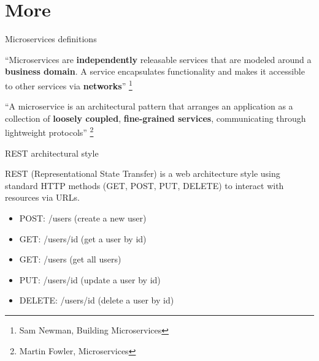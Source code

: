 \documentclass{beamer}
\begin{document}
\section{More}
\begin{frame}{Microservices definitions}
	\label{microservices_definitions}
	\begin{block}{}
		“Microservices are \textbf{independently} releasable services that are modeled around a \textbf{business domain}. A service encapsulates functionality and makes it accessible to other services via \textbf{networks}” \footnote{Sam Newman, Building Microservices}
	\end{block}
	\begin{block}{}
		“A microservice is an architectural pattern that arranges an application as a collection of \textbf{loosely coupled}, \textbf{fine-grained services}, communicating through lightweight protocols” \footnote{Martin Fowler, Microservices}
	\end{block}

\hyperlink{index_1}{}
\end{frame}

\begin{frame}{REST architectural style}
	\begin{block}{}
		REST (Representational State Transfer) is a web architecture style using standard HTTP methods (GET, POST, PUT, DELETE) to interact with resources via URLs.
	\end{block}
	\begin{itemize}
		\item POST: /users (create a new user)
		\item GET: /users/{id} (get a user by id)
		\item GET: /users (get all users)
		\item PUT: /users/{id} (update a user by id)
		\item DELETE: /users/{id} (delete a user by id)
	\end{itemize}
	
	\label{rest}
\hyperlink{index_1}{}
\end{frame}
\end{document}
